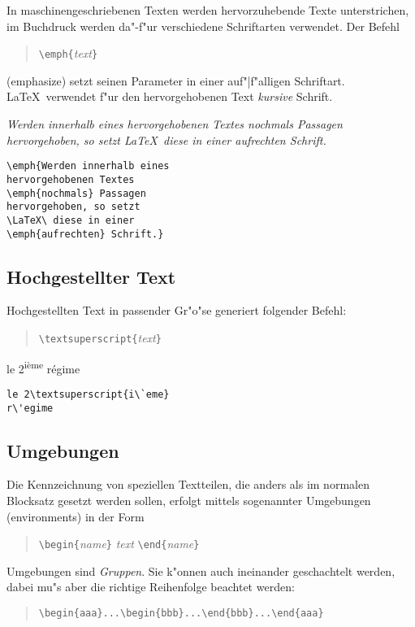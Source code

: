 In maschinengeschriebenen Texten werden hervorzuhebende Texte
unterstrichen, im Buchdruck werden da"-f"ur verschiedene
Schriftarten verwendet.
Der Befehl 
\begin{quote}
\verb|\emph{|\textit{text}\verb|}| 
\end{quote}
(emphasize) setzt seinen Parameter in einer auf"|f"alligen
Schriftart.
\LaTeX\ verwendet f"ur den hervorgehobenen Text \textit{kursive}
Schrift.

\exa 
\emph{Werden innerhalb eines hervorgehobenen Textes
\emph{nochmals} Passagen hervorgehoben, so setzt \LaTeX\ diese in
einer \emph{aufrechten} Schrift.}
\exb
\begin{verbatim}
\emph{Werden innerhalb eines 
hervorgehobenen Textes 
\emph{nochmals} Passagen
hervorgehoben, so setzt
\LaTeX\ diese in einer 
\emph{aufrechten} Schrift.}
\end{verbatim}
\exc


\subsection{Hochgestellter Text}
Hochgestellten Text in passender Gr"o"se generiert folgender Befehl:
\begin{quote}
\verb|\textsuperscript{|\textit{text}\verb|}|
\end{quote}
\exa
le 2\textsuperscript{i\`eme} r\'egime
\exb
\begin{verbatim}
le 2\textsuperscript{i\`eme}
r\'egime
\end{verbatim}
\exc




\subsection{Umgebungen} \label{env}

Die Kennzeichnung von speziellen Textteilen, die anders als im
normalen Blocksatz gesetzt werden sollen, erfolgt mittels
sogenannter Umgebungen (environments) in der Form
\begin{quote}
\verb|\begin{|\textit{name}\verb|}|\quad
   \textit{text}\quad
   \verb|\end{|\textit{name}\verb|}|
\end{quote}
Umgebungen sind \emph{Gruppen}.
Sie k"onnen auch ineinander geschachtelt werden, dabei mu"s aber
die richtige Reihenfolge beachtet werden:
\begin{quote}
\verb|\begin{aaa}...\begin{bbb}...\end{bbb}...\end{aaa}|
\end{quote}


